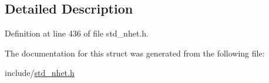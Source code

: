 \subsection{Detailed Description}


Definition at line 436 of file std\+\_\+nhet.\+h.



The documentation for this struct was generated from the following file\+:\begin{DoxyCompactItemize}
\item 
include/\mbox{\hyperlink{std__nhet_8h}{std\+\_\+nhet.\+h}}\end{DoxyCompactItemize}
